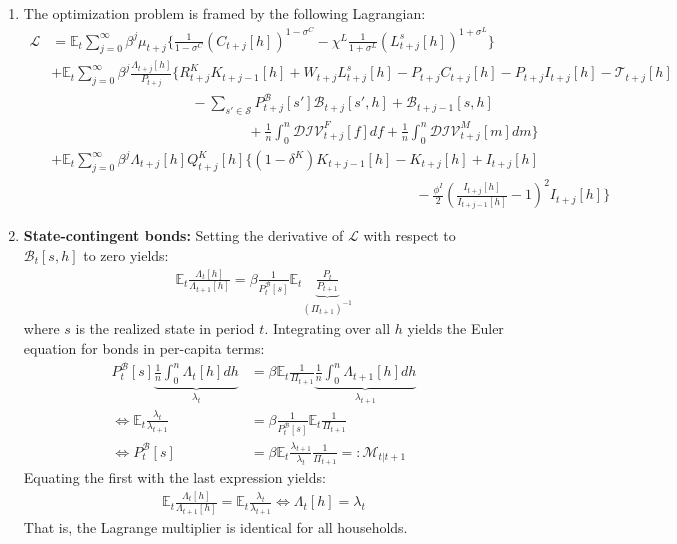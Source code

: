 \begin{enumerate}

\item
The optimization problem is framed by the following Lagrangian:
\begin{align*}
\mathcal{L} &= \mathbb{E}_{t} \sum_{j=0}^{\infty} \beta^{j} \mu_{t+j} \Bigg \{
  \frac{1}{1-\sigma^{C}} {(C_{t+j}[h])}^{1-\sigma^{C}}
  - \chi^{L} \frac{1}{1+\sigma^{L}} {(L^{s}_{t+j}[h])}^{1+\sigma^{L}}
  \Bigg \}
\\
&+ \mathbb{E}_{t} \sum_{j=0}^{\infty} \beta^{j} \frac{\Lambda_{t+j}[h]}{P_{t+j}} \Bigg \{
  R^{K}_{t+j} K_{t+j-1}[h]
+ W_{t+j} L^{s}_{t+j}[h]
- P_{t+j} C_{t+j}[h] - P_{t+j} I_{t+j}[h]
- \mathcal{T}_{t+j}[h]
\\
&\qquad\qquad\qquad\qquad\qquad
- \sum_{s' \in \mathcal{S}} P^{\mathcal{B}}_{t+j}[s'] \mathcal{B}_{t+j}[s',h]
+ \mathcal{B}_{t+j-1}[s,h]
\\
&\qquad\qquad\qquad\qquad\qquad\qquad\qquad
+ \frac{1}{n} \int_{0}^{n} \mathcal{DIV}^{F}_{t+j}[f] df
+ \frac{1}{n} \int_{0}^{n} \mathcal{DIV}^{M}_{t+j}[m] dm
\Bigg \}
\\
&+ \mathbb{E}_{t} \sum_{j=0}^{\infty} \beta^{j} \Lambda_{t+j}[h] Q^{K}_{t+j}[h] \Bigg \{
(1-\delta^{K}) K_{t+j-1}[h]  - K_{t+j}[h] + I_{t+j}[h] 
\\
&\qquad\qquad\qquad\qquad\qquad\qquad\qquad\qquad\qquad\qquad\qquad\qquad\qquad
- \frac{\phi^{I}}{2} {\left(\frac{I_{t+j}[h]}{I_{t+j-1}[h]} - 1 \right)}^2 I_{t+j}[h]
\Bigg \}
\end{align*}

\item
\textbf{State-contingent bonds:} Setting the derivative of \(\mathcal{L}\) with respect to \(\mathcal{B}_{t}[s,h]\) to zero yields:
\begin{align*}
\mathbb{E}_{t} \frac{\Lambda_{t}[h]}{\Lambda_{t+1}[h]} = \beta \frac{1}{P^{\mathcal{B}}_{t}[s]} \mathbb{E}_{t} \underbrace{\frac{P_{t}}{P_{t+1}}}_{{(\Pi_{t+1})}^{-1}}
\end{align*}
where \(s\) is the realized state in period \(t\).
Integrating over all \(h\) yields the Euler equation for bonds in per-capita terms:
\begin{align*}
P^{\mathcal{B}}_{t}[s] \underbrace{\frac{1}{n} \int_{0}^{n} \Lambda_{t}[h] dh}_{\lambda_{t}}  &= \beta \mathbb{E}_{t} \frac{1}{\Pi_{t+1}} \underbrace{\frac{1}{n}\int_{0}^{n} \Lambda_{t+1}[h] dh}_{\lambda_{t+1}}
\\
\Leftrightarrow
\mathbb{E}_{t} \frac{\lambda_{t}}{\lambda_{t+1}} &= \beta \frac{1}{P^{\mathcal{B}}_{t}[s]} \mathbb{E}_{t} \frac{1}{\Pi_{t+1}}
\\
\Leftrightarrow
P^{\mathcal{B}}_{t}[s] &= \beta \mathbb{E}_{t} \frac{\lambda_{t+1}}{\lambda_{t}} \frac{1}{\Pi_{t+1}} =: \mathcal{M}_{t|t+1}
\end{align*}
Equating the first with the last expression yields:
\begin{gather*}
\mathbb{E}_{t} \frac{\Lambda_{t}[h]}{\Lambda_{t+1}[h]} = \mathbb{E}_{t} \frac{\lambda_{t}}{\lambda_{t+1}}
\Leftrightarrow
\Lambda_{t}[h] = \lambda_{t}
\end{gather*}
That is, the Lagrange multiplier is identical for all households.


\end{enumerate}
